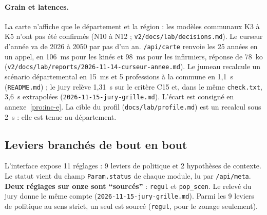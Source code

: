 \paragraph{Grain et latences.}
La carte n'affiche que le département et la région : les modèles communaux K3 à K5 n'ont pas été confirmés (N10 à N12 ; \texttt{v2/\allowbreak{}docs/\allowbreak{}lab/\allowbreak{}decisions.md}).
Le curseur d'année va de 2026 à 2050 par pas d'un an.
\texttt{/\allowbreak{}api/\allowbreak{}carte} renvoie les 25\derive{} années en un appel, en 106\mesure{}~ms pour les kinés et 98\mesure{}~ms pour les infirmiers, réponse de 78\mesure{}~ko (\texttt{v2/\allowbreak{}docs/\allowbreak{}lab/\allowbreak{}reports/\allowbreak{}2026-\allowbreak{}11-\allowbreak{}14-\allowbreak{}curseur-\allowbreak{}annee.md}).
Le jumeau recalcule un scénario départemental en 15\mesure{}~ms et 5\mesure{} professions à la commune en 1,1\mesure{}~s (\texttt{README.md}) ; le jury relève 1,31\mesure{}~s sur le critère C15 et, dans le même \texttt{check.txt}, 3,6\derive{}~s extrapolées (\texttt{2026-\allowbreak{}11-\allowbreak{}15-\allowbreak{}jury-\allowbreak{}grille.md}). L'écart est consigné en annexe~\ref{pro:inc-e}.
La cible du profil (\texttt{docs/\allowbreak{}lab/\allowbreak{}profile.md}) est un recalcul sous 2\suppose{}~s : elle est tenue au département.

\subsection{Leviers branchés de bout en bout}\label{pro:leviers}

L'interface expose 11\mesure{} réglages : 9\mesure{} leviers de politique et 2\mesure{} hypothèses de contexte.
Le statut vient du champ \texttt{Param.status} de chaque module, lu par \texttt{/\allowbreak{}api/\allowbreak{}meta}.
\textbf{Deux réglages sur onze sont \enquote{sourcés}}\mesure{} : \texttt{regul} et \texttt{pop\_\allowbreak{}scen}. Le relevé du jury donne le même compte (\texttt{2026-\allowbreak{}11-\allowbreak{}15-\allowbreak{}jury-\allowbreak{}grille.md}).
Parmi les 9\mesure{} leviers de politique au sens strict, un seul est sourcé (\texttt{regul}, pour le zonage seulement)\derive{}.

